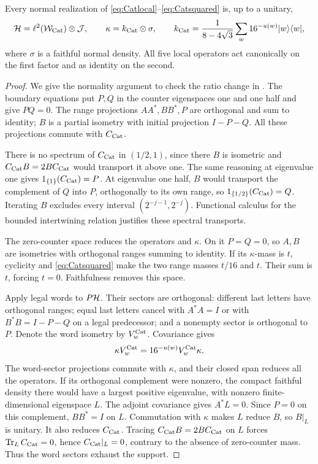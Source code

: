 \begin{lemma}\label{lem:Catclassification}
Every normal realization of \eqref{eq:Catlocal}--\eqref{eq:Catsquared} is, up to a unitary,
\[
 \mathcal H=\ell^2(\mathcal W_{\rm Cat})\otimes\mathcal J,\qquad
 \kappa=k_{\mathrm{Cat}}\otimes\sigma,\qquad
 k_{\mathrm{Cat}}=\frac1{8-4\sqrt3}\sum_w16^{-u(w)}|w\rangle\langle w|,
\]
where $\sigma$ is a faithful normal density. All five local operators act canonically on the first factor and as identity on the second.
\end{lemma}
\begin{proof}
We give the normality argument to check the ratio change in \cite[Lemma~3.1]{Entropy}. The boundary equations put $P,Q$ in the counter eigenspaces one and one half and give $PQ=0$. The range projections $AA^*,BB^*,P$ are orthogonal and sum to identity; $B$ is a partial isometry with initial projection $I-P-Q$. All these projections commute with $C_{\mathrm{Cat}}$.

There is no spectrum of $C_{\mathrm{Cat}}$ in $(1/2,1)$, since there $B$ is isometric and $C_{\mathrm{Cat}} B=2BC_{\mathrm{Cat}}$ would transport it above one. The same reasoning at eigenvalue one gives $1_{\{1\}}(C_{\mathrm{Cat}})=P$. At eigenvalue one half, $B$ would transport the complement of $Q$ into $P$, orthogonally to its own range, so $1_{\{1/2\}}(C_{\mathrm{Cat}})=Q$. Iterating $B$ excludes every interval $(2^{-j-1},2^{-j})$. Functional calculus for the bounded intertwining relation justifies these spectral transports.

The zero-counter space reduces the operators and $\kappa$. On it $P=Q=0$, so $A,B$ are isometries with orthogonal ranges summing to identity. If its $\kappa$-mass is $t$, cyclicity and \eqref{eq:Catsquared} make the two range masses $t/16$ and $t$. Their sum is $t$, forcing $t=0$. Faithfulness removes this space.

Apply legal words to $P\mathcal H$. Their sectors are orthogonal: different last letters have orthogonal ranges; equal last letters cancel with $A^*A=I$ or with $B^*B=I-P-Q$ on a legal predecessor; and a nonempty sector is orthogonal to $P$. Denote the word isometry by $V_w^{\rm Cat}$. Covariance gives
\[
 \kappa V_w^{\rm Cat}=16^{-u(w)}V_w^{\rm Cat}\kappa.
\]
The word-sector projections commute with $\kappa$, and their closed span reduces all the operators. If its orthogonal complement were nonzero, the compact faithful density there would have a largest positive eigenvalue, with nonzero finite-dimensional eigenspace $L$. The adjoint covariance gives $A^*L=0$. Since $P=0$ on this complement, $BB^*=I$ on $L$. Commutation with $\kappa$ makes $L$ reduce $B$, so $B|_L$ is unitary. It also reduces $C_{\mathrm{Cat}}$. Tracing $C_{\mathrm{Cat}} B=2BC_{\mathrm{Cat}}$ on $L$ forces $\operatorname{Tr}_L C_{\mathrm{Cat}}=0$, hence $C_{\mathrm{Cat}}|_L=0$, contrary to the absence of zero-counter mass. Thus the word sectors exhaust the support.


\end{proof}
